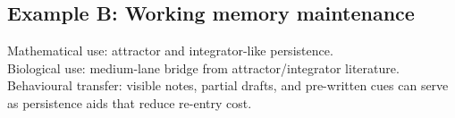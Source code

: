 \subsection*{Example B: Working memory maintenance}

Mathematical use: attractor and integrator-like persistence.\\
Biological use: medium-lane bridge from attractor/integrator literature.\\
Behavioural transfer: visible notes, partial drafts, and pre-written cues can
serve as persistence aids that reduce re-entry cost.

